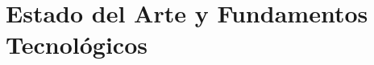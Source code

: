 \chapter{Estado del Arte y Fundamentos Tecnológicos}
\label{ch:estado-del-arte-y-fundamentos-tecnologicos}





